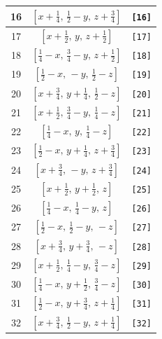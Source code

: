 \documentclass[fleqn,8pt]{jsarticle}
\begin{document}
\begin{longtable}{ccc}
16 & $\left[ x + \frac{1}{4},\, \frac{1}{2} - y,\, z + \frac{3}{4} \right]$ & {\tt [16]} \\ \hline
17 & $\left[ x + \frac{1}{2},\, y,\, z + \frac{1}{2} \right]$ & {\tt [17]} \\ \hline
18 & $\left[ \frac{1}{4} - x,\, \frac{3}{4} - y,\, z + \frac{1}{2} \right]$ & {\tt [18]} \\ \hline
19 & $\left[ \frac{1}{2} - x,\, - y,\, \frac{1}{2} - z \right]$ & {\tt [19]} \\ \hline
20 & $\left[ x + \frac{3}{4},\, y + \frac{1}{4},\, \frac{1}{2} - z \right]$ & {\tt [20]} \\ \hline
21 & $\left[ x + \frac{1}{2},\, \frac{3}{4} - y,\, \frac{1}{4} - z \right]$ & {\tt [21]} \\ \hline
22 & $\left[ \frac{1}{4} - x,\, y,\, \frac{1}{4} - z \right]$ & {\tt [22]} \\ \hline
23 & $\left[ \frac{1}{2} - x,\, y + \frac{1}{4},\, z + \frac{3}{4} \right]$ & {\tt [23]} \\ \hline
24 & $\left[ x + \frac{3}{4},\, - y,\, z + \frac{3}{4} \right]$ & {\tt [24]} \\ \hline
25 & $\left[ x + \frac{1}{2},\, y + \frac{1}{2},\, z \right]$ & {\tt [25]} \\ \hline
26 & $\left[ \frac{1}{4} - x,\, \frac{1}{4} - y,\, z \right]$ & {\tt [26]} \\ \hline
27 & $\left[ \frac{1}{2} - x,\, \frac{1}{2} - y,\, - z \right]$ & {\tt [27]} \\ \hline
28 & $\left[ x + \frac{3}{4},\, y + \frac{3}{4},\, - z \right]$ & {\tt [28]} \\ \hline
29 & $\left[ x + \frac{1}{2},\, \frac{1}{4} - y,\, \frac{3}{4} - z \right]$ & {\tt [29]} \\ \hline
30 & $\left[ \frac{1}{4} - x,\, y + \frac{1}{2},\, \frac{3}{4} - z \right]$ & {\tt [30]} \\ \hline
31 & $\left[ \frac{1}{2} - x,\, y + \frac{3}{4},\, z + \frac{1}{4} \right]$ & {\tt [31]} \\ \hline
32 & $\left[ x + \frac{3}{4},\, \frac{1}{2} - y,\, z + \frac{1}{4} \right]$ & {\tt [32]} \\
\end{longtable}
\end{document}
